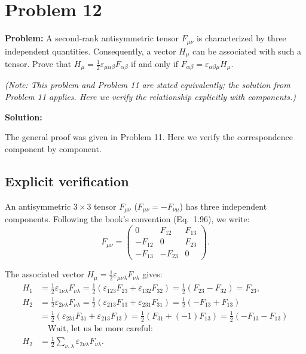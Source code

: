 \documentclass[12pt]{article}
\begin{document}
\section*{Problem 12}

\textbf{Problem:} A second-rank antisymmetric tensor $F_{\mu\nu}$ is characterized by three independent quantities. Consequently, a vector $H_\mu$ can be associated with such a tensor. Prove that $H_\mu = \frac{1}{2}\varepsilon_{\mu\alpha\beta}F_{\alpha\beta}$ if and only if $F_{\alpha\beta} = \varepsilon_{\alpha\beta\mu}H_\mu$.

\textit{(Note: This problem and Problem 11 are stated equivalently; the solution from Problem 11 applies. Here we verify the relationship explicitly with components.)}

\bigskip
\textbf{Solution:}

The general proof was given in Problem 11. Here we verify the correspondence component by component.

\subsection*{Explicit verification}

An antisymmetric $3\times 3$ tensor $F_{\mu\nu}$ ($F_{\mu\nu} = -F_{\nu\mu}$) has three independent components. Following the book's convention (Eq.~1.96), we write:
\[
F_{\mu\nu} = \begin{pmatrix} 0 & F_{12} & F_{13} \\ -F_{12} & 0 & F_{23} \\ -F_{13} & -F_{23} & 0 \end{pmatrix}.
\]

The associated vector $H_\mu = \frac{1}{2}\varepsilon_{\mu\nu\lambda}F_{\nu\lambda}$ gives:
\begin{align}
H_1 &= \tfrac{1}{2}\varepsilon_{1\nu\lambda}F_{\nu\lambda} = \tfrac{1}{2}(\varepsilon_{123}F_{23} + \varepsilon_{132}F_{32}) = \tfrac{1}{2}(F_{23} - F_{32}) = F_{23}, \\
H_2 &= \tfrac{1}{2}\varepsilon_{2\nu\lambda}F_{\nu\lambda} = \tfrac{1}{2}(\varepsilon_{213}F_{13} + \varepsilon_{231}F_{31}) = \tfrac{1}{2}(-F_{13} + F_{13}) \nonumber \\
    &= \tfrac{1}{2}(\varepsilon_{231}F_{31} + \varepsilon_{213}F_{13}) = \tfrac{1}{2}(F_{31} + (-1)F_{13}) = \tfrac{1}{2}(-F_{13} - F_{13}) \nonumber \\
    &\quad\text{Wait, let us be more careful:} \nonumber \\
H_2 &= \tfrac{1}{2}\sum_{\nu,\lambda}\varepsilon_{2\nu\lambda}F_{\nu\lambda}. \nonumber
\end{align}
\end{document}
